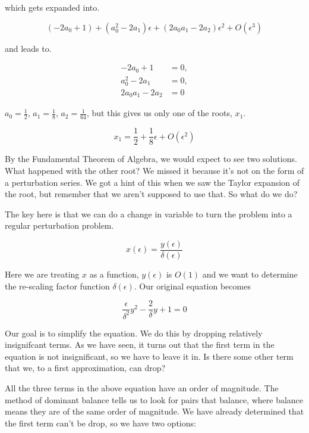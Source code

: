 \documentclass[12pt]{article}
\begin{document}
which gets expanded into.

\begin{equation}
(- 2 a_0 + 1) + (a_0^2 - 2 a_1) \epsilon + (2 a_0 a_1 -2 a_2) \epsilon^2 +
O(\epsilon^3)
\end{equation}

and leads to.

\begin{align*}
- 2 a_0 + 1 &= 0, \\
a_0^2 - 2 a_1 &= 0, \\
2 a_0 a_1 -2 a_2 &= 0
\end{align*}

$a_0 = \frac{1}{2}$, $a_1=\frac{1}{8}$, $a_2= \frac{1}{64}$, but this gives us
only one of the roots, $x_1$.

\begin{equation}
x_1 = \frac{1}{2} + \frac{1}{8} \epsilon + O(\epsilon^2)
\end{equation}

By the Fundamental Theorem of Algebra, we would expect to see two solutions.
What happened with the other root? We missed it because it's not on the form of
a perturbation series. We got a hint of this when we saw the Taylor expansion of
the root, but remember that we aren't supposed to use that. So what do we do?

The key here is that we can do a change in variable to turn the problem into a
regular perturbation problem.

\begin{equation}
x(\epsilon) = \frac{y(\epsilon)}{\delta(\epsilon)}
\end{equation}

Here we are treating $x$ as a function, $y(\epsilon)$ is $O(1)$ and we want to
determine the re-scaling factor function $\delta(\epsilon)$. Our original
equation becomes

\begin{equation}
\frac{\epsilon}{\delta^2} y^2 - \frac{2}{\delta} y + 1 = 0
\end{equation}

Our goal is to simplify the equation. We do this by dropping relatively
insignifcant terms. As we have seen, it turns out that the first term in the
equation is not insignificant, so we have to leave it in. Is there some other
term that we, to a first approximation, can drop?

All the three terms in the above equation have an order of magnitude. The method
of dominant balance tells us to look for pairs that balance, where balance means
they are of the same order of magnitude. We have already determined that the
first term can't be drop, so we have two options:
\end{document}
